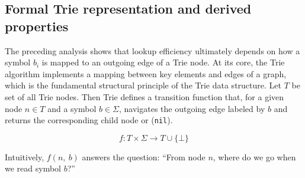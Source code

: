 \documentclass[11pt,twoside]{article}
\begin{document}
    \begin{table}[ht]
        \caption{Benchmarking find operation.}
        \label{tab:findResult}
    \end{table}



    \subsection{Formal Trie representation and derived properties}\label{sec:formal-representation}

    The preceding analysis shows that lookup efficiency ultimately
    depends on how a symbol $b_i$ is mapped to an outgoing edge of a Trie node.
    At its core, the Trie algorithm implements a mapping
    between key elements and edges of a graph, which is the fundamental
    structural principle of the Trie data structure. Let $T$ be set of all Trie nodes. Then Trie
    defines a transition function that, for a given node \(n \in T\) and a symbol \(b \in \Sigma\),
    navigates the outgoing edge labeled by $b$ and returns the corresponding
    child node or (\texttt{nil}).

    \begin{equation}
        f:T \times \Sigma \rightarrow T \cup \{\bot\}
    \end{equation}

    Intuitively, \(f(n,~b)\) answers the question: ``From node
    $n$, where do we go when we read symbol $b$?''
\end{document}
